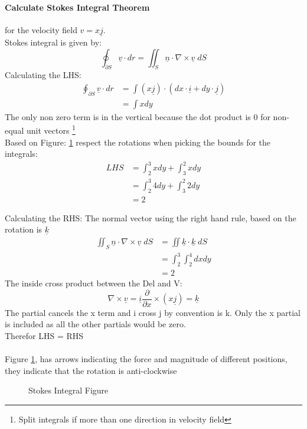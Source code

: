 \documentclass[12pt, letterpaper]{article}
\newcommand{\un}[1]{\underline{#1}}
\newcommand{\partFrac}[2]{\frac{\partial #1}{\partial #2}}
\begin{document}
	\paragraph{Calculate Stokes Integral Theorem} for the velocity field $v=x \un{j}$.
		\\ Stokes integral is given by:
		\begin{equation}
			\oint_{\partial S} \un{v}\cdot dr = \iint_S \un{n} \cdot \nabla \times \un{v} \; dS
		\end{equation}
		Calculating the LHS:
		\begin{align}
			\oint_{\partial S} \un{v}\cdot dr &= \int (x\un{j}) \cdot (dx \cdot \un{i} + dy \cdot \un{j}) \\
											  &= \int x dy
		\end{align}
		The only non zero term is in the vertical because the dot product is 0 for non-equal unit vectors 
		\footnote{Split integrals if more than one direction in velocity field}
		\\ Based on Figure: \ref{fg:2} respect the rotations when picking the bounds for the integrals:
		\begin{align}
			LHS &= \int_2^3 x dy + \int_3^2 x dy \\
				&= \int_2^3 4 dy + \int_3^2 2 dy \\
				&= 2
		\end{align}

		Calculating the RHS:
		The normal vector using the right hand rule, based on the rotation is $\un{k}$
		\begin{align}
			\iint_S \un{n} \cdot \nabla \times \un{v} \; dS &= \iint \un{k} \cdot \un{k} \; dS \\
															&= \int_2^3 \int_2^4 dxdy \\
															&= 2
		\end{align}
		The inside cross product between the Del and V:
		\begin{equation}
			\nabla \times \un{v} = \un{i} \partFrac{}{x} \times (x \un{j}) = \un{k}
		\end{equation}
		The partial cancels the x term and i cross j by convention is k. Only the x partial is included as all the 
		other partials would be zero. \\
		Therefor LHS = RHS \\
		\\
		Figure \ref{fg:2}, has arrows indicating the force and magnitude of different positions, they indicate that the rotation is
		anti-clockwise
		\begin{figure}[ht]
			\centering
			\caption{Stokes Integral Figure}
			\label{fg:2}
		\end{figure}
\end{document}
